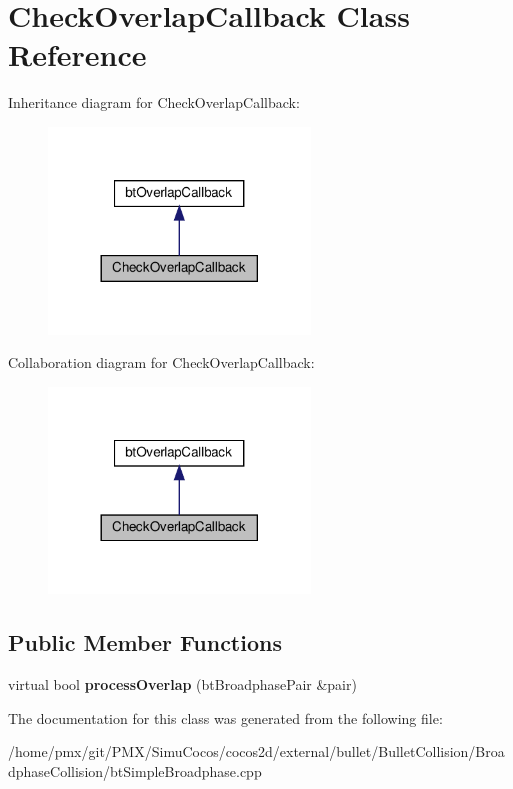 \hypertarget{classCheckOverlapCallback}{}\section{Check\+Overlap\+Callback Class Reference}
\label{classCheckOverlapCallback}


Inheritance diagram for Check\+Overlap\+Callback\+:
\nopagebreak
\begin{figure}[H]
\begin{center}
\leavevmode
\includegraphics[width=197pt]{classCheckOverlapCallback__inherit__graph}
\end{center}
\end{figure}


Collaboration diagram for Check\+Overlap\+Callback\+:
\nopagebreak
\begin{figure}[H]
\begin{center}
\leavevmode
\includegraphics[width=197pt]{classCheckOverlapCallback__coll__graph}
\end{center}
\end{figure}
\subsection*{Public Member Functions}
\begin{DoxyCompactItemize}
\item 
\mbox{\label{classCheckOverlapCallback_a6ad545232cda0d2eda94c5044fd983b2}} 
virtual bool {\bfseries process\+Overlap} (bt\+Broadphase\+Pair \&pair)
\end{DoxyCompactItemize}


The documentation for this class was generated from the following file\+:\begin{DoxyCompactItemize}
\item 
/home/pmx/git/\+P\+M\+X/\+Simu\+Cocos/cocos2d/external/bullet/\+Bullet\+Collision/\+Broadphase\+Collision/bt\+Simple\+Broadphase.\+cpp\end{DoxyCompactItemize}
